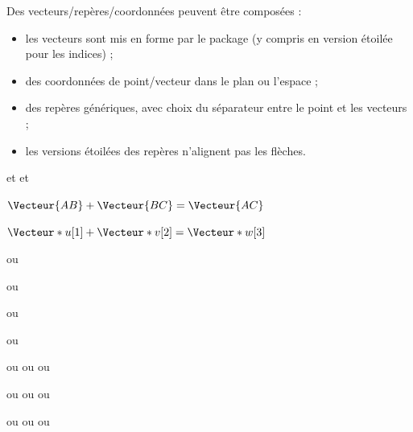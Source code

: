 \documentclass[a4paper,french,11pt]{article}
\newcommand\ctex[1]{\tcbox[vignettelatex]{#1}}
\begin{document}
\begin{tipblock}
Des vecteurs/repères/coordonnées peuvent être composées :

\begin{itemize}
	\item les vecteurs sont mis en forme par le package \ctex{esvect} (y compris en version étoilée pour les indices) ;
	\item des coordonnées de point/vecteur dans le plan ou l'espace ;
	\item des repères génériques, avec choix du séparateur entre le point et les vecteurs ;
	\item les versions étoilées des repères n'alignent pas les flèches.
\end{itemize}
\vspace*{-\baselineskip}\leavevmode
\end{tipblock}

\begin{PresCodeTexPL}{}
\Vecteur{\imath} et  et 

$\Vecteur{AB}+\Vecteur{BC} = \Vecteur{AC}$

$\Vecteur*{u}[1]+\Vecteur*{v}[2] = \Vecteur*{w}[3]$
\end{PresCodeTexPL}

\begin{PresCodeTexPL}{}
 ou 

 ou 
\end{PresCodeTexPL}

\begin{PresCodeTexPL}{}
 ou 

 ou 
\end{PresCodeTexPL}

\begin{PresCodeTexPL}{}

\end{PresCodeTexPL}

\begin{PresCodeTexPL}{}
\RepereOij ou \RepereOij* ou \RepereOij[Sep={,}] ou \RepereOij*[Sep={,}]

\RepereOijk ou \RepereOijk* ou \RepereOijk[Sep={,}] ou \RepereOijk*[Sep={,}]

\RepereOuv ou \RepereOuv* ou \RepereOuv[Sep={,}] ou \RepereOuv*[Sep={,}]
\end{PresCodeTexPL}
\end{document}
